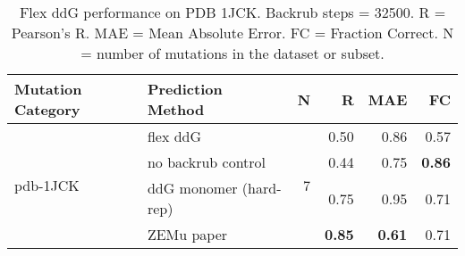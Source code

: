 \begin{table}
  \begin{tabular}{llrrrr}
\toprule
Mutation Category &       Prediction Method &  N &    R &  MAE &   FC \\
\midrule
 \multirow{ 4}{*}{pdb-1JCK} & flex ddG & \multirow{ 4}{*}{7} & 0.50 & 0.86 & 0.57  \\
 & no backrub control & & 0.44 & 0.75 & \textbf{0.86}  \\
 & ddG monomer (hard-rep) & & 0.75 & 0.95 & 0.71  \\
 & ZEMu paper & & \textbf{0.85} & \textbf{0.61} & 0.71  \\
\bottomrule
\end{tabular}
  \caption[Flex ddG performance on PDB 1JCK]{
    Flex ddG performance on PDB 1JCK. Backrub steps = 32500. R = Pearson's R. MAE = Mean Absolute Error. FC = Fraction Correct. N = number of mutations in the dataset or subset.
  } \label{tab:table-pdb-1JCK}
\end{table}
